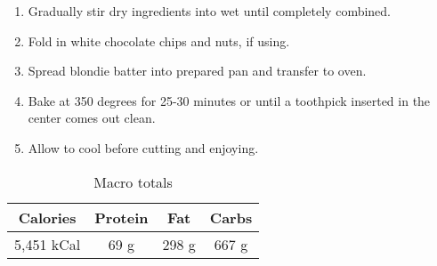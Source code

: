 \documentclass{report}
\begin{document}
\begin{multicols}{2}
\begin{enumerate}
\medskip
\item Gradually stir dry ingredients into wet until completely combined.
\medskip

\medskip
\item Fold in white chocolate chips and nuts, if using.
\medskip

\medskip
\item Spread blondie batter into prepared pan and transfer to oven.
\medskip

\medskip
\item Bake at 350 degrees for 25-30 minutes or until a toothpick inserted in the center comes out clean.
\medskip

\medskip
\item Allow to cool before cutting and enjoying.
\medskip

\end{enumerate}
\begin{table}[H]
  \begin{center}
    \caption{Macro totals}
    \label{tab:table1}
    \begin{tabular}{c|c|c|c} %
      \textbf{Calories} & \textbf{Protein} & \textbf{Fat} & \textbf{Carbs}\\
      \hline
     5,451  kCal & 69 g & 298 g & 667 g\\
    \end{tabular}
  \end{center}
\end{table}
\end{multicols}



\end{document}
